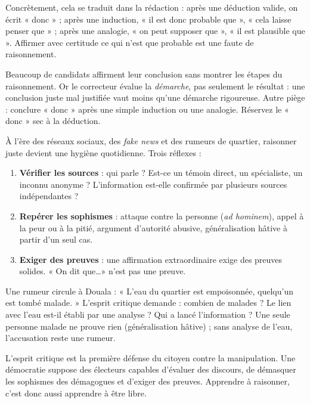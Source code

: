 \documentclass[11pt]{article}
\newcounter{popsec}
\newcounter{popsub}
\newcommand{\courssub}[1]{%
  \stepcounter{popsub}%
  \par\vspace{9pt}\noindent{\popxbold\fontsize{11.5}{13}\selectfont\color{popink}{\color{poporange}\thepopsec.\thepopsub}\hspace{6pt}#1}\par\nopagebreak\vspace{4pt}
}
\begin{document}
Concrètement, cela se traduit dans la rédaction : après une déduction valide, on écrit « donc » ; après une induction, « il est donc probable que », « cela laisse penser que » ; après une analogie, « on peut supposer que », « il est plausible que ». Affirmer avec certitude ce qui n'est que probable est une faute de raisonnement.

\begin{attention}
Beaucoup de candidats affirment leur conclusion sans montrer les étapes du raisonnement. Or le correcteur évalue la \emph{démarche}, pas seulement le résultat : une conclusion juste mal justifiée vaut moins qu'une démarche rigoureuse. Autre piège : conclure « donc » après une simple induction ou une analogie. Réservez le « donc » sec à la déduction.
\end{attention}

\courssub{Esprit critique face aux informations}

À l'ère des réseaux sociaux, des \emph{fake news} et des rumeurs de quartier, raisonner juste devient une hygiène quotidienne. Trois réflexes :

\begin{enumerate}
\item \textbf{Vérifier les sources} : qui parle ? Est-ce un témoin direct, un spécialiste, un inconnu anonyme ? L'information est-elle confirmée par plusieurs sources indépendantes ?
\item \textbf{Repérer les sophismes} : attaque contre la personne (\emph{ad hominem}), appel à la peur ou à la pitié, argument d'autorité abusive, généralisation hâtive à partir d'un seul cas.
\item \textbf{Exiger des preuves} : une affirmation extraordinaire exige des preuves solides. « On dit que\ldots » n'est pas une preuve.
\end{enumerate}

\begin{exemplebox}
Une rumeur circule à Douala : « L'eau du quartier est empoisonnée, quelqu'un est tombé malade. » L'esprit critique demande : combien de malades ? Le lien avec l'eau est-il établi par une analyse ? Qui a lancé l'information ? Une seule personne malade ne prouve rien (généralisation hâtive) ; sans analyse de l'eau, l'accusation reste une rumeur.
\end{exemplebox}

\begin{savaistu}
L'esprit critique est la première défense du citoyen contre la manipulation. Une démocratie suppose des électeurs capables d'évaluer des discours, de démasquer les sophismes des démagogues et d'exiger des preuves. Apprendre à raisonner, c'est donc aussi apprendre à être libre.
\end{savaistu}
\end{document}
